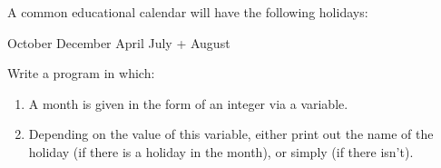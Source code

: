 A common educational calendar will have the following holidays:
\begin{itemize}
   October
   December
   April
   July + August
\end{itemize}

Write a program in which:
\begin{enumerate}
  \item A month is given in the form of an integer via a variable.
  \item Depending on the value of this variable, either print out the name of the holiday (if there is a holiday in the month), or simply  (if there isn't).
\end{enumerate}
